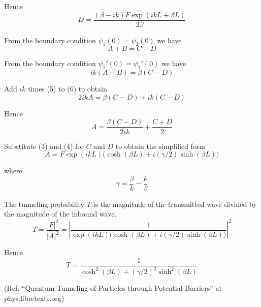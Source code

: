 Hence
\begin{equation*}
D=\frac{(\beta-ik)F\exp(ikL+\beta L)}{2\beta}
\tag{4}
\end{equation*}

From the boundary condition $\psi_1(0)=\psi_2(0)$ we have
\begin{equation*}
A+B=C+D
\tag{5}
\end{equation*}

From the boundary condition $\psi_1'(0)=\psi_2'(0)$ we have
\begin{equation*}
ik(A-B)=\beta(C-D)
\tag{6}
\end{equation*}

Add $ik$ times (5) to (6) to obtain
\begin{equation*}
2ikA=\beta(C-D)+ik(C-D)
\end{equation*}

Hence
\begin{equation*}
A=\frac{\beta(C-D)}{2ik}+\frac{C+D}{2}
\end{equation*}

Substitute (3) and (4) for $C$ and $D$ to obtain
the simplified form
\begin{equation*}
A = F\exp(ikL)\bigl(\cosh(\beta L)+i(\gamma/2)\sinh(\beta L)\bigr)
\tag{7}
\end{equation*}

where
\begin{equation*}
\gamma=\frac{\beta}{k}-\frac{k}{\beta}
\end{equation*}

The tunneling probability $T$ is the magnitude of the transmitted
wave divided by the magnitude of the inbound wave.
\begin{equation*}
T=\frac{|F|^2}{|A|^2}
=\left|\frac{1}{\exp(ikL)\bigl(\cosh(\beta L)+i(\gamma/2)\sinh(\beta L)\bigr)}\right|^2
\end{equation*}

Hence
\begin{equation*}
T=\frac{1}{\cosh^2(\beta L)+(\gamma/2)^2\sinh^2(\beta L)}
\tag{8}
\end{equation*}

(Ref. ``Quantum Tunneling of Particles through Potential Barriers''
at phys.libretexts.org)


